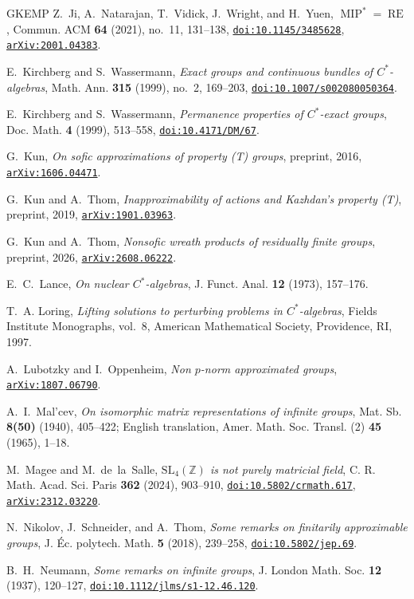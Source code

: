 \documentclass[11pt]{amsart}
\newcommand{\doi}[1]{\href{https://doi.org/#1}{\nolinkurl{doi:#1}}}
\newcommand{\arxiv}[1]{\href{https://arxiv.org/abs/#1}{\nolinkurl{arXiv:#1}}}
\theoremstyle{definition}
\theoremstyle{remark}
\theoremstyle{plain}
\begin{document}
\begin{thebibliography}{GKEMP}
Z.~Ji, A.~Natarajan, T.~Vidick, J.~Wright, and H.~Yuen,
\emph{$\operatorname{MIP}^*=\operatorname{RE}$},
Commun. ACM \textbf{64} (2021), no.~11, 131--138,
\doi{10.1145/3485628}, \arxiv{2001.04383}.

E.~Kirchberg and S.~Wassermann,
\emph{Exact groups and continuous bundles of $C^*$-algebras},
Math. Ann. \textbf{315} (1999), no.~2, 169--203,
\doi{10.1007/s002080050364}.

E.~Kirchberg and S.~Wassermann,
\emph{Permanence properties of $C^*$-exact groups},
Doc. Math. \textbf{4} (1999), 513--558,
\doi{10.4171/DM/67}.

G.~Kun,
\emph{On sofic approximations of property (T) groups},
preprint, 2016, \arxiv{1606.04471}.

G.~Kun and A.~Thom,
\emph{Inapproximability of actions and Kazhdan's property (T)},
preprint, 2019, \arxiv{1901.03963}.

G.~Kun and A.~Thom,
\emph{Nonsofic wreath products of residually finite groups},
preprint, 2026, \arxiv{2608.06222}.

E.~C.~Lance,
\emph{On nuclear $C^*$-algebras},
J. Funct. Anal. \textbf{12} (1973), 157--176.

T.~A. Loring,
\emph{Lifting solutions to perturbing problems in $C^*$-algebras},
Fields Institute Monographs, vol.~8,
American Mathematical Society, Providence, RI, 1997.

A.~Lubotzky and I.~Oppenheim,
\emph{Non $p$-norm approximated groups},
\arxiv{1807.06790}.

A.~I.~Mal'cev,
\emph{On isomorphic matrix representations of infinite groups},
Mat. Sb. \textbf{8(50)} (1940), 405--422;
English translation, Amer. Math. Soc. Transl. (2) \textbf{45} (1965), 1--18.

M.~Magee and M.~de~la~Salle,
\emph{$\mathrm{SL}_4(\mathbb{Z})$ is not purely matricial field},
C. R. Math. Acad. Sci. Paris \textbf{362} (2024), 903--910,
\doi{10.5802/crmath.617}, \arxiv{2312.03220}.

N.~Nikolov, J.~Schneider, and A.~Thom,
\emph{Some remarks on finitarily approximable groups},
J. \'Ec. polytech. Math. \textbf{5} (2018), 239--258,
\doi{10.5802/jep.69}.

B.~H.~Neumann,
\emph{Some remarks on infinite groups},
J. London Math. Soc. \textbf{12} (1937), 120--127,
\doi{10.1112/jlms/s1-12.46.120}.


\end{thebibliography}
\end{document}
